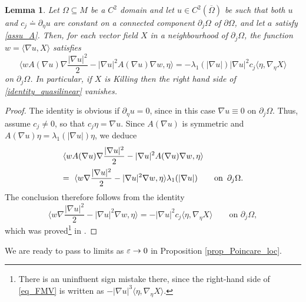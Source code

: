 \documentclass[10 pt,a4paper]{article}
\newtheorem{lemma}[definition]{Lemma}
\theoremstyle{definition}
\begin{document}
\begin{lemma}\label{lem_bordo}
	Let $\Omega\subseteq M$ be a $C^2$ domain and let $u \in C^2(\overline\Omega)$ be such that both $u$ and $c_j \doteq \partial_\eta u$ are constant on a connected component $\partial_j \Omega$ of $\partial\Omega$, and let $a$ satisfy \eqref{assu_A}. Then, for each vector field $X$ in a neighbourhood of $\partial_j \Omega$, the function $w= \langle \nabla u, X\rangle$ satisfies
	\begin{equation}\label{identity_quasilinear}
		\langle w A(\nabla u) \nabla \frac{|\nabla u|^2}{2} - |\nabla u|^2  A(\nabla u)\nabla w, \eta\rangle = - \lambda_1(|\nabla u|)|\nabla u|^2 c_j \langle \eta, \nabla_{\eta} X \rangle
	\end{equation}
	on $\partial_j \Omega$. In particular, if $X$ is Killing then the right hand side of \eqref{identity_quasilinear} vanishes.
\end{lemma}

\begin{proof}
	The identity is obvious if $\partial_\eta u = 0$, since in this case $\nabla u \equiv 0$ on $\partial_j \Omega$. Thus, assume $c_j \neq 0$, so that $c_j \eta = \nabla u$. Since $A(\nabla u)$ is symmetric and $A(\nabla u)\eta = \lambda_1(|\nabla u|) \eta$, we deduce
	\[
		\begin{array}{l}
			\displaystyle \langle w A(\nabla u) \nabla \frac{|\nabla u|^2}{2} - |\nabla u|^2  A(\nabla u)\nabla w, \eta\rangle \\[0.3cm]
			= \ \displaystyle \langle w \nabla \frac{|\nabla u|^2}{2} - |\nabla u|^2 \nabla w, \eta\rangle \lambda_1(|\nabla u|) \qquad \text{on } \, \partial_j \Omega.
	\end{array}
	\]
	The conclusion therefore follows from the identity 
	\begin{equation}\label{eq_FMV}
		\langle w \nabla \frac{|\nabla u|^2}{2} - |\nabla u|^2 \nabla w, \eta \rangle =  - |\nabla u|^2 c_j \langle \eta, \nabla_\eta X \rangle \qquad \text{on } \partial_j \Omega,
	\end{equation} 
	which was proved\footnote{There is an uninfluent sign mistake there, since the right-hand side of \eqref{eq_FMV} is written as $- |\nabla u|^3 \langle \eta, \nabla_\eta X \rangle$.} in \cite[Lemma 32]{FarMarVal}.
\end{proof}

We are ready to pass to limits as $\varepsilon \to 0$ in Proposition \ref{prop_Poincare_loc}.
\end{document}
